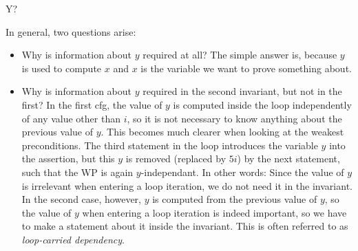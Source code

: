 \documentclass[
  english
]{tumteaching}
\begin{document}
\begin{assignment}[L]{Y?}
\begin{solution}
	In general, two questions arise:
	\begin{itemize}
		\item Why is information about $y$ required at all? The simple answer is, because $y$ is used to compute $x$ and $x$ is the variable we want to prove something about.
		\item Why is information about $y$ required in the second invariant, but not in the first? In the first cfg, the value of $y$ is computed inside the loop independently of any value other than $i$, so it is not necessary to know anything about the previous value of $y$. This becomes much clearer when looking at the weakest preconditions. The third statement in the loop introduces the variable $y$ into the assertion, but this $y$ is removed (replaced by $5i$) by the next statement, such that the WP is again $y$-independant. In other words: Since the value of $y$ is irrelevant when entering a loop iteration, we do not need it in the invariant. In the second case, however, $y$ is computed from the previous value of $y$, so the value of $y$ when entering a loop iteration is indeed important, so we have to make a statement about it inside the invariant. This is often referred to as \emph{loop-carried dependency}.
	\end{itemize}
\end{solution}
\end{assignment}
\end{document}

